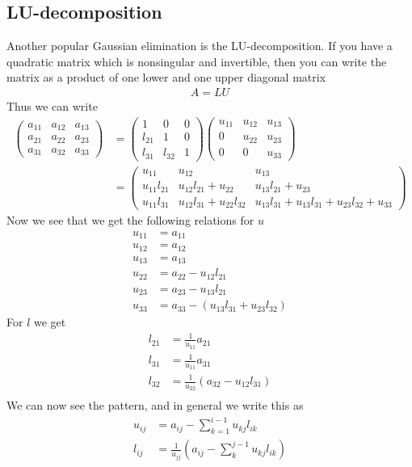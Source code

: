\documentclass[12pt]{article}
\numberwithin{equation}{section}     %
\begin{document}
\subsection{LU-decomposition}

Another popular Gaussian elimination is the LU-decomposition. If you have a quadratic matrix which is nonsingular and invertible, then you can write the matrix as a product of one lower and one upper diagonal matrix
\begin{align}
    A=LU
\end{align}
Thus we can write
\begin{align*}
    \begin{pmatrix}
 a_{11}&  a_{12}&  a_{13}\\
 a_{21}&  a_{22}&  a_{23}\\
 a_{31}&  a_{32}&  a_{33}
    \end{pmatrix}
    &=
    \begin{pmatrix}
1&  0&  0\\
l_{21}&  1&  0\\
l_{31}&  l_{32}&  1
    \end{pmatrix}
    \begin{pmatrix}
u_{11}&  u_{12}&  u_{13}\\
0&  u_{22}&  u_{23}\\
0&  0&  u_{33}
    \end{pmatrix}\\
    &=
    \begin{pmatrix}
u_{11}&  u_{12}&  u_{13}\\
u_{11}l_{21}&  u_{12}l_{21}+u_{22}&  u_{13}l_{21}+u_{23}\\
u_{11}l_{31}&  u_{12}l_{31}+u_{22}l_{32}& u_{13}l_{31}+u_{13}l_{31}+u_{23}l_{32}+u_{33}
    \end{pmatrix}
\end{align*}
Now we see that we get the following relations for $u$
\begin{align*}
u_{11}&=a_{11}\\
u_{12}&=a_{12}\\
u_{13}&=a_{13}\\
u_{22}&=a_{22}-u_{12}l_{21}\\
u_{23}&=a_{23}-u_{13}l_{21}\\
u_{33}&=a_{33}-(u_{13}l_{31}+u_{23}l_{32})
\end{align*}
For $l$ we get
\begin{align*}
l_{21}&=\frac{1}{u_{11}}a_{21}\\
l_{31}&=\frac{1}{u_{11}}a_{31}\\
l_{32}&=\frac{1}{u_{22}}(a_{32}-u_{12}l_{31})\\
\end{align*}
We can now see the pattern, and in general we write this as
\begin{align*}
    u_{ij}&=a_{ij}-\sum_{k=1}^{i-1}u_{kj}l_{ik}\\
    l_{ij}&=\frac{1}{u_{jj}}(a_{ij}-\sum_{k}^{j-1}u_{kj}l_{ik})
\end{align*}
\end{document}
